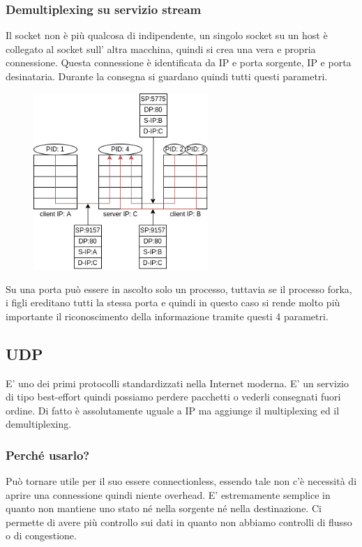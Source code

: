 \subsubsection{Demultiplexing su servizio stream}
Il socket non è più qualcosa di indipendente, un singolo socket su un host è collegato al socket sull' altra macchina, quindi si crea una vera e propria connessione.
Questa connessione è identificata da IP e porta sorgente, IP e porta desinataria.
Durante la consegna si guardano quindi tutti questi parametri.
\begin{figure}[H]
    \centering
    \includegraphics[width=250px]{images/6_Trasporto/demux_with_multiprocess.png}
\end{figure}
Su una porta può essere in ascolto solo un processo, tuttavia se il processo forka, i figli ereditano tutti la stessa porta e quindi in questo caso si rende molto più importante il riconoscimento della informazione tramite questi 4 parametri.

\subsection{UDP}
E' uno dei primi protocolli standardizzati nella Internet moderna.
E' un servizio di tipo best-effort quindi possiamo perdere pacchetti o vederli consegnati fuori ordine.
Di fatto è assolutamente uguale a IP ma aggiunge il multiplexing ed il demultiplexing.

\subsubsection{Perché usarlo?}
Può tornare utile per il suo essere connectionless, essendo tale non c'è necessità di aprire una connessione quindi niente overhead.
E' estremamente semplice in quanto non mantiene uno stato né nella sorgente né nella destinazione.
Ci permette di avere più controllo sui dati in quanto non abbiamo controlli di flusso o di congestione.

